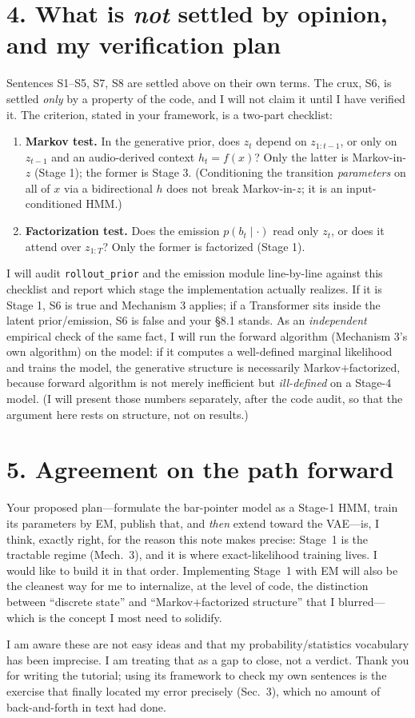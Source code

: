 \documentclass[11pt]{article}
\begin{document}
\section*{4. What is \emph{not} settled by opinion, and my verification plan}

Sentences S1--S5, S7, S8 are settled above on their own terms. The crux, S6, is settled \emph{only}
by a property of the code, and I will not claim it until I have verified it. The criterion, stated in
your framework, is a two-part checklist:
\begin{enumerate}[leftmargin=1.6em]
\item \textbf{Markov test.} In the generative prior, does $z_t$ depend on $z_{1:t-1}$, or only on
$z_{t-1}$ and an audio-derived context $h_t=f(x)$? Only the latter is Markov-in-$z$ (Stage 1); the
former is Stage 3. (Conditioning the transition \emph{parameters} on all of $x$ via a bidirectional
$h$ does not break Markov-in-$z$; it is an input-conditioned HMM.)
\item \textbf{Factorization test.} Does the emission $p(b_t\mid\cdot)$ read only $z_t$, or does it
attend over $z_{1:T}$? Only the former is factorized (Stage 1).
\end{enumerate}
I will audit \texttt{rollout\_prior} and the emission module line-by-line against this checklist and
report which stage the implementation actually realizes. If it is Stage 1, S6 is true and Mechanism 3
applies; if a Transformer sits inside the latent prior/emission, S6 is false and your \S8.1 stands.
As an \emph{independent} empirical check of the same fact, I will run the forward algorithm
(Mechanism 3's own algorithm) on the model: if it computes a well-defined marginal likelihood and
trains the model, the generative structure is necessarily Markov$+$factorized, because forward
algorithm is not merely inefficient but \emph{ill-defined} on a Stage-4 model. (I will present those
numbers separately, after the code audit, so that the argument here rests on structure, not on
results.)

\section*{5. Agreement on the path forward}

Your proposed plan---formulate the bar-pointer model as a Stage-1 HMM, train its parameters by EM,
publish that, and \emph{then} extend toward the VAE---is, I think, exactly right, for the reason this
note makes precise: Stage~1 is the tractable regime (Mech.~3), and it is where exact-likelihood
training lives. I would like to build it in that order. Implementing Stage~1 with EM will also be the
cleanest way for me to internalize, at the level of code, the distinction between ``discrete state''
and ``Markov$+$factorized structure'' that I blurred---which is the concept I most need to solidify.

\medskip
\noindent I am aware these are not easy ideas and that my probability/statistics vocabulary has been
imprecise. I am treating that as a gap to close, not a verdict. Thank you for writing the tutorial;
using its framework to check my own sentences is the exercise that finally located my error precisely
(Sec.~3), which no amount of back-and-forth in text had done.
\end{document}
